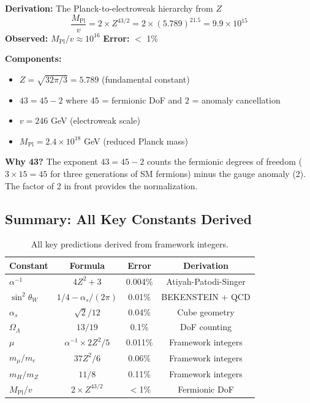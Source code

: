 \documentclass[12pt,a4paper]{article}
\newcommand{\OmegaL}{\Omega_\Lambda}
\newcommand{\sinW}{\sin^2\theta_W}
\newcommand{\Zsq}{Z^2}
\begin{document}
\begin{derivedbox}
\textbf{Derivation:} The Planck-to-electroweak hierarchy from $Z$
\begin{equation}
\frac{M_{\text{Pl}}}{v} = 2 \times Z^{43/2} = 2 \times (5.789)^{21.5} = 9.9 \times 10^{15}
\end{equation}
\textbf{Observed:} $M_{\text{Pl}}/v \approx 10^{16}$ \quad \textbf{Error:} $<$ 1\%
\end{derivedbox}

\textbf{Components:}
\begin{itemize}
    \item $Z = \sqrt{32\pi/3} = 5.789$ (fundamental constant)
    \item $43 = 45 - 2$ where $45$ = fermionic DoF and $2$ = anomaly cancellation
    \item $v = 246$ GeV (electroweak scale)
    \item $M_{\text{Pl}} = 2.4 \times 10^{18}$ GeV (reduced Planck mass)
\end{itemize}

\textbf{Why 43?} The exponent $43 = 45 - 2$ counts the fermionic degrees of freedom ($3 \times 15 = 45$ for three generations of SM fermions) minus the gauge anomaly (2). The factor of 2 in front provides the normalization.

\subsection{Summary: All Key Constants Derived}

\begin{table}[H]
\centering
\begin{tabular}{lccc}
\toprule
\textbf{Constant} & \textbf{Formula} & \textbf{Error} & \textbf{Derivation} \\
\midrule
$\alpha^{-1}$ & $4\Zsq + 3$ & 0.004\% & Atiyah-Patodi-Singer \\
$\sinW$ & $1/4 - \alpha_s/(2\pi)$ & 0.01\% & BEKENSTEIN + QCD \\
$\alpha_s$ & $\sqrt{2}/12$ & 0.04\% & Cube geometry \\
$\OmegaL$ & $13/19$ & 0.1\% & DoF counting \\
$\mu$ & $\alpha^{-1} \times 2\Zsq/5$ & 0.011\% & Framework integers \\
$m_\mu/m_e$ & $37\Zsq/6$ & 0.06\% & Framework integers \\
$m_H/m_Z$ & $11/8$ & 0.11\% & Framework integers \\
$M_{\text{Pl}}/v$ & $2 \times Z^{43/2}$ & $<$1\% & Fermionic DoF \\
\bottomrule
\end{tabular}
\caption{All key predictions derived from framework integers.}
\end{table}
\end{document}
